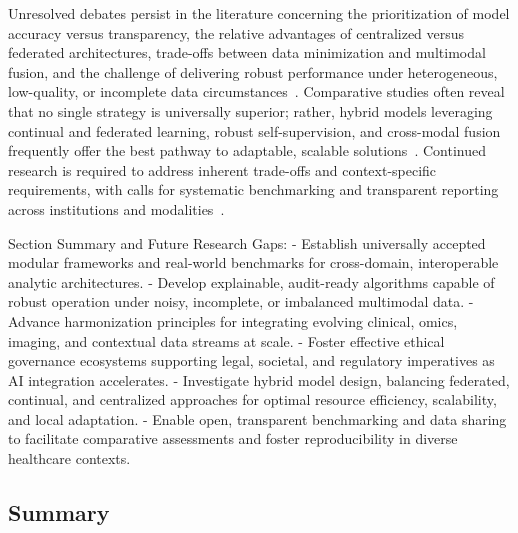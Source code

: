 \documentclass[sigconf]{acmart}
\begin{document}
Unresolved debates persist in the literature concerning the prioritization of model accuracy versus transparency, the relative advantages of centralized versus federated architectures, trade-offs between data minimization and multimodal fusion, and the challenge of delivering robust performance under heterogeneous, low-quality, or incomplete data circumstances~\cite{ref37,ref54,ref76,ref78,ref79,ref84,ref90}. Comparative studies often reveal that no single strategy is universally superior; rather, hybrid models leveraging continual and federated learning, robust self-supervision, and cross-modal fusion frequently offer the best pathway to adaptable, scalable solutions~\cite{ref36,ref37,ref43,ref78,ref79,ref84,ref90,ref104,ref105,ref106,ref107}. Continued research is required to address inherent trade-offs and context-specific requirements, with calls for systematic benchmarking and transparent reporting across institutions and modalities~\cite{ref44,ref45,ref50,ref61,ref65}.

Section Summary and Future Research Gaps:
- Establish universally accepted modular frameworks and real-world benchmarks for cross-domain, interoperable analytic architectures.
- Develop explainable, audit-ready algorithms capable of robust operation under noisy, incomplete, or imbalanced multimodal data.
- Advance harmonization principles for integrating evolving clinical, omics, imaging, and contextual data streams at scale.
- Foster effective ethical governance ecosystems supporting legal, societal, and regulatory imperatives as AI integration accelerates.
- Investigate hybrid model design, balancing federated, continual, and centralized approaches for optimal resource efficiency, scalability, and local adaptation.
- Enable open, transparent benchmarking and data sharing to facilitate comparative assessments and foster reproducibility in diverse healthcare contexts.

\subsection{Summary}
\end{document}
